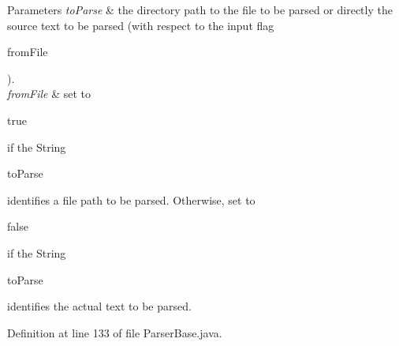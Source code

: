 \begin{DoxyParams}{Parameters}
{\em to\-Parse} & the directory path to the file to be parsed or directly the source text to be parsed (with respect to the input flag
\begin{DoxyCode}
fromFile 
\end{DoxyCode}
 ). \\
\hline
{\em from\-File} & set to
\begin{DoxyCode}
\textcolor{keyword}{true} 
\end{DoxyCode}
 if the String
\begin{DoxyCode}
toParse 
\end{DoxyCode}
 identifies a file path to be parsed. Otherwise, set to
\begin{DoxyCode}
\textcolor{keyword}{false} 
\end{DoxyCode}
 if the String
\begin{DoxyCode}
toParse 
\end{DoxyCode}
 identifies the actual text to be parsed. \\
\hline
\end{DoxyParams}


Definition at line 133 of file Parser\-Base.\-java.

